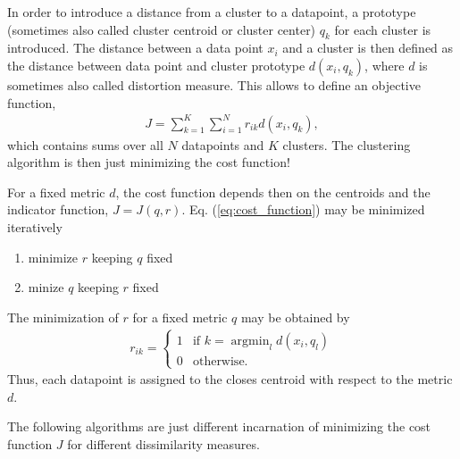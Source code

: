 \documentclass[10pt,a4paper]{article}
\begin{document}
In order to introduce a distance from a cluster to a datapoint, a prototype (sometimes also called cluster centroid or cluster center) $q_k$ for each cluster is introduced.  The distance between a data point $x_i$ and a cluster is then defined as the distance between data point and cluster prototype $d(x_i, q_k)$, where $d$ is sometimes also called distortion measure. This allows to define an objective function,
\begin{align} \label{eq:cost_function}
J = \sum _{k=1}^K \sum_{i=1} ^ N  r_{ik} d(x_i, q_k), 
\end{align} 
which contains  sums over all $N$ datapoints and $K$ clusters.
The clustering algorithm is then just minimizing the cost function!

For a fixed metric $d$, the cost function depends then on the centroids and the indicator function, $J=J(q, r)$. Eq. (\ref{eq:cost_function}) may be minimized  iteratively 
\begin{enumerate}
\item minimize $r$ keeping $q$ fixed
\item minize $q$ keeping $r$ fixed
\end{enumerate}
The minimization of $r$ for a fixed metric $q$ may be obtained by
\begin{align}
r_{ik} = \begin{cases}
1 & \text{if } k = \operatorname{argmin}_l d(x_i, q_l)  \\
0 & \text{otherwise}.
\end{cases}
\end{align}
Thus, each datapoint is assigned to the closes centroid with respect to the metric $d$. 
 
The following algorithms are just different incarnation of minimizing the cost function $J$ for different dissimilarity measures.
\end{document}
